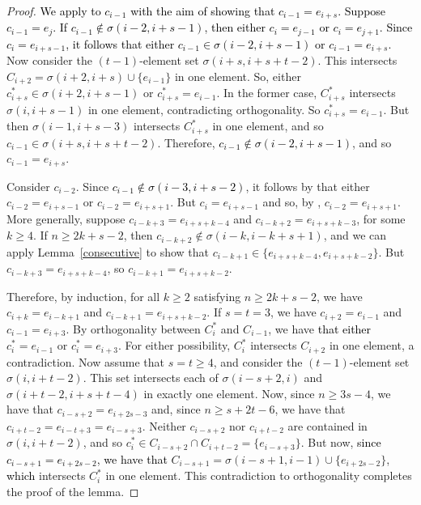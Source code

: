\documentclass[11pt]{amsart}
\newcommand{\blue}{\textcolor{black}}
\newcommand{\bloo}{\textcolor{black}}
\begin{document}
\begin{proof}
\blue{\bloo{We apply  to $c_{i-1}$ with the aim of showing that $c_{i-1}=e_{i+s}$}. Suppose $c_{i-1} = e_j$. If $c_{i-1} \notin \sigma(i-2,i+s-1)$, then either $c_i = e_{j-1}$ or $c_i = e_{j+1}$. Since $c_i = e_{i+s-1}$, it follows that either $c_{i-1} \in \sigma(i-2,i+s-1)$ or $c_{i-1} = e_{i+s}$.} Now consider the $(t-1)$-element set $\sigma(i+s, i+s+t-2)$. This intersects $C_{i+2} = \sigma(i+2, i+s) \cup \{e_{i-1}\}$ in one element. So, either $c^*_{i+s} \in \sigma(i+2,i+s-1)$ or $c^*_{i+s} = e_{i-1}$. In the former case, $C^*_{i+s}$ intersects $\sigma(i, i+s-1)$ in one element, contradicting orthogonality. So $c^*_{i+s} = e_{i-1}$. But then $\sigma(i-1, i+s-3)$ intersects $C^*_{i+s}$ in one element, and so $c_{i-1} \in \sigma(i+s, i+s+t-2)$. Therefore, \bloo{$c_{i-1} \notin \sigma(i-2,i+s-1)$}, and so $c_{i-1} = e_{i+s}$.

Consider $c_{i-2}$. Since \bloo{$c_{i-1} \notin \sigma(i-3, i+s-2)$}, it follows by  that either $c_{i-2}=e_{i+s-1}$ or $c_{i-2}=e_{i+s+1}$. But $c_i = e_{i+s-1}$ and so, by , $c_{i-2} = e_{i+s+1}$. More generally, suppose $c_{i-k+3} = e_{i+s+k-4}$ and $c_{i-k+2} = e_{i+s+k-3}$, for some $k \geq 4$. If $n \geq 2k+s-2$, then $c_{i-k+2} \notin \sigma(i-k, i-k+s+1)$, and we can apply Lemma~\ref{consecutive} to show that $c_{i-k+1} \in \{e_{i+s+k-4}, e_{i+s+k-2}\}$. But $c_{i-k+3} = e_{i+s+k-4}$, so $c_{i-k+1} = e_{i+s+k-2}$.

Therefore, by induction, for all $k \geq 2$ satisfying $n \geq 2k+s-2$, we have $c_{i+k} = e_{i-k+1}$ and $c_{i-k+1}=e_{i+s+k-2}$. If $s=t=3$, we have $c_{i+2}=e_{i-1}$ and $c_{i-1}=e_{i+3}$. By orthogonality between $C^*_i$ and $C_{i-1}$, we have \bloo{that either} $c^*_i=e_{i-1}$ or $c^*_i=e_{i+3}$. For either possibility, $C^*_i$ intersects $C_{i+2}$ in one element, a contradiction. Now assume that $s=t\ge 4$, and consider the $(t-1)$-element set $\sigma(i,i+t-2)$. This set intersects each of $\sigma(i-s+2, i)$ and $\sigma(i+t-2, i+s+t-4)$ in exactly one element. Now, since $n \geq 3s-4$, we have that $c_{i-s+2} = e_{i+2s-3}$ and, since $n \geq s+2t-6$, we have that $c_{i+t-2}=e_{i-t+3}=e_{i-s+3}$. Neither $c_{i-s+2}$ nor $c_{i+t-2}$ are contained in $\sigma(i,i+t-2)$, and so $c^*_{i} \in C_{i-s+2} \cap C_{i+t-2} = \{e_{i-s+3}\}$. But now, \blue{since $c_{i-s+1} = e_{i+2s-2}$, we have that} $C_{i-s+1} = \sigma(i-s+1,i-1) \cup \{e_{i+2s-2}\}$, \bloo{which} intersects $C^*_i$ in one element. This contradiction to orthogonality completes the proof of the lemma.
\end{proof}
\end{document}

